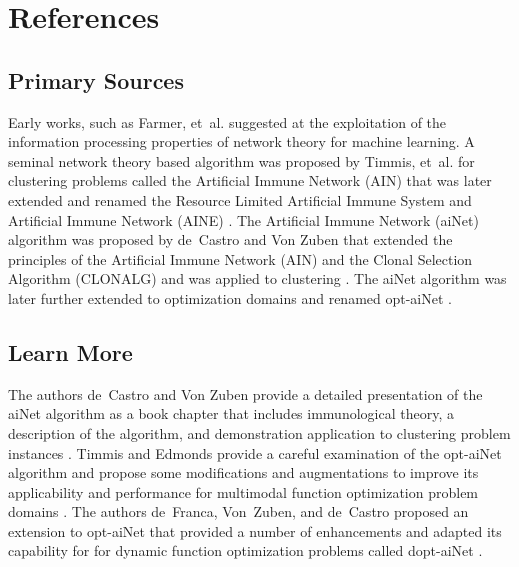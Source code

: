 \documentclass[a4paper, 11pt]{article}
\begin{document}
\section{References}
\label{sec:references}

% 
% 
\subsection{Primary Sources}
Early works, such as Farmer, et~al. \cite{Farmer1986} suggested at the exploitation of the information processing properties of network theory for machine learning.
A seminal network theory based algorithm was proposed by Timmis, et~al. for clustering problems called the Artificial Immune Network (AIN) \cite{Timmis2000} that was later extended and renamed the Resource Limited Artificial Immune System \cite{Timmis2001} and Artificial Immune Network (AINE) \cite{Knight2001}.
The Artificial Immune Network (aiNet) algorithm was proposed by de~Castro and Von Zuben that extended the principles of the Artificial Immune Network (AIN) and the Clonal Selection Algorithm (CLONALG) and was applied to clustering \cite{Castro2000a}. The aiNet algorithm was later further extended to optimization domains and renamed opt-aiNet \cite{Castro2002c}.

% 
% 
\subsection{Learn More}
The authors de~Castro and Von Zuben provide a detailed presentation of the aiNet algorithm as a book chapter that includes immunological theory, a description of the algorithm, and demonstration application to clustering problem instances \cite{Castro2001}.
Timmis and Edmonds provide a careful examination of the opt-aiNet algorithm and propose some modifications and augmentations to improve its applicability and performance for multimodal function optimization problem domains \cite{Timmis2004}.
The authors de~Franca, Von~Zuben, and de~Castro proposed an extension to opt-aiNet that provided a number of enhancements and adapted its capability for for dynamic function optimization problems called dopt-aiNet \cite{Franca2005}.
\end{document}
